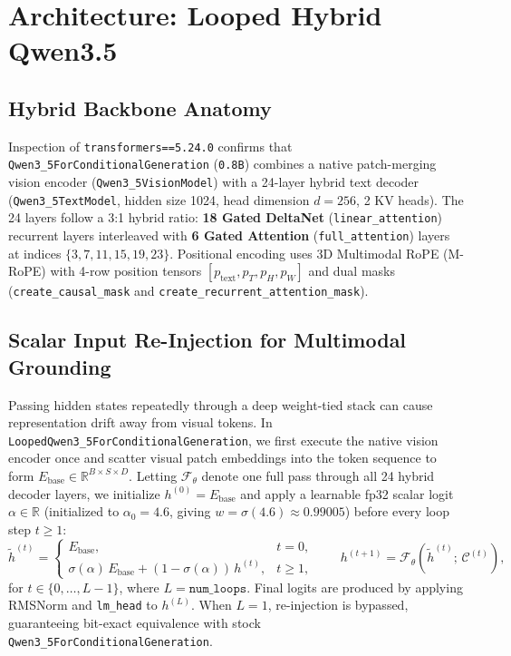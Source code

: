 \documentclass[10pt,letterpaper]{article}
\begin{document}
\section{Architecture: Looped Hybrid Qwen3.5}
\subsection{Hybrid Backbone Anatomy}
Inspection of \texttt{transformers==5.24.0} confirms that \texttt{Qwen3\_5ForConditionalGeneration} (\texttt{0.8B}) combines a native patch-merging vision encoder (\texttt{Qwen3\_5VisionModel}) with a 24-layer hybrid text decoder (\texttt{Qwen3\_5TextModel}, hidden size 1024, head dimension $d=256$, 2 KV heads). The 24 layers follow a 3:1 hybrid ratio: \textbf{18 Gated DeltaNet} (\texttt{linear\_attention}) recurrent layers interleaved with \textbf{6 Gated Attention} (\texttt{full\_attention}) layers at indices $\{3, 7, 11, 15, 19, 23\}$. Positional encoding uses 3D Multimodal RoPE (M-RoPE) with 4-row position tensors $[p_{\text{text}}, p_T, p_H, p_W]$ and dual masks (\texttt{create\_causal\_mask} and \texttt{create\_recurrent\_attention\_mask}).

\subsection{Scalar Input Re-Injection for Multimodal Grounding}
Passing hidden states repeatedly through a deep weight-tied stack can cause representation drift away from visual tokens. In \texttt{LoopedQwen3\_5ForConditionalGeneration}, we first execute the native vision encoder once and scatter visual patch embeddings into the token sequence to form $E_{\text{base}} \in \mathbb{R}^{B \times S \times D}$. Letting $\mathcal{F}_\theta$ denote one full pass through all 24 hybrid decoder layers, we initialize $h^{(0)} = E_{\text{base}}$ and apply a learnable fp32 scalar logit $\alpha \in \mathbb{R}$ (initialized to $\alpha_0 = 4.6$, giving $w = \sigma(4.6) \approx 0.99005$) before every loop step $t \ge 1$:
\begin{equation}
    \tilde{h}^{(t)} =
    \begin{cases}
        E_{\text{base}}, & t = 0, \\
        \sigma(\alpha)\, E_{\text{base}} + (1 - \sigma(\alpha))\, h^{(t)}, & t \ge 1,
    \end{cases}
    \qquad
    h^{(t+1)} = \mathcal{F}_\theta\!\left(\tilde{h}^{(t)};\, \mathcal{C}^{(t)}\right),
    \label{eq:loop_reinject}
\end{equation}
for $t \in \{0, \dots, L-1\}$, where $L = \texttt{num\_loops}$. Final logits are produced by applying RMSNorm and \texttt{lm\_head} to $h^{(L)}$. When $L=1$, re-injection is bypassed, guaranteeing bit-exact equivalence with stock \texttt{Qwen3\_5ForConditionalGeneration}.
\end{document}
